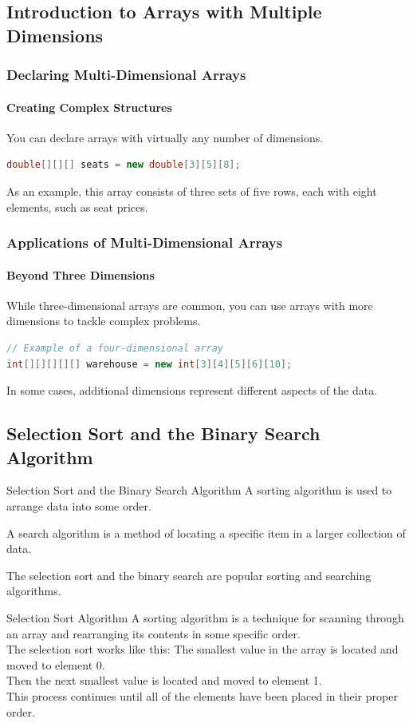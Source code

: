 \documentclass[11pt]{beamer}
\begin{document}
\subsection{Introduction to Arrays with Multiple Dimensions}
\begin{frame}[fragile]
\frametitle{Declaring Multi-Dimensional Arrays}
\framesubtitle{Creating Complex Structures}

You can declare arrays with virtually any number of dimensions.
\begin{lstlisting}[language=Java]
double[][][] seats = new double[3][5][8];
\end{lstlisting}
As an example, this array consists of three sets of five rows, each with eight elements, such as seat prices.
\end{frame}

\begin{frame}[fragile]
\frametitle{Applications of Multi-Dimensional Arrays}
\framesubtitle{Beyond Three Dimensions}

While three-dimensional arrays are common, you can use arrays with more dimensions to tackle complex problems.

\begin{lstlisting}[language=Java]
// Example of a four-dimensional array
int[][][][][] warehouse = new int[3][4][5][6][10];
\end{lstlisting}
In some cases, additional dimensions represent different aspects of the data.
\end{frame}

\subsection{Selection Sort and the Binary Search Algorithm}
\begin{frame}{Selection Sort and the Binary Search Algorithm}
    A sorting algorithm is used to arrange data into some order. \\ \vspace{1em}

    A search algorithm is a method of locating a specific item in a larger collection of data. \\ \vspace{1em}
    
    The selection sort and the binary search are popular sorting and searching algorithms.
\end{frame}

\begin{frame}{Selection Sort Algorithm}
    A sorting algorithm is a technique for scanning through an array and rearranging its contents in some specific order. \\ \vspace{1em} 
    The selection sort works like this: The smallest value in the array is located and moved to element 0. \\ \vspace{1em} 
    Then the next smallest value is located and moved to element 1. \\ \vspace{1em} 
    This process continues until all of the elements have been placed in their proper order.
\end{frame}
\end{document}
